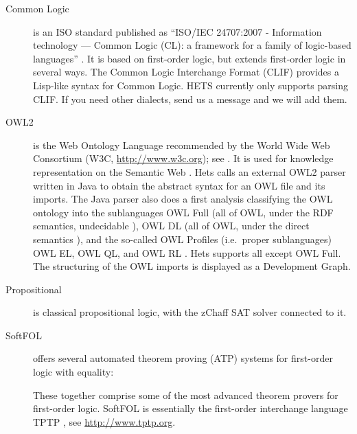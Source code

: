 \documentclass{article}
\newcommand{\normalTEXTSC}[2]{{#1\scriptsize#2}}
\newcommand     {\Hets}{\normalTEXTSC{H}{ETS}\xspace}
\newcommand     {\SPASS}{\normalTEXTSC{S}{PASS}\xspace}
\begin{document}
\begin{description}


\item[Common Logic] is an ISO standard published as ``ISO/IEC 24707:2007 - Information technology — Common Logic (CL): a framework for a family of logic-based languages'' \cite{CommonLogic:oldfashioned}. It is based on first-order logic, but extends first-order
logic in several ways.   The Common Logic
  Interchange Format (CLIF) provides a Lisp-like syntax for Common
  Logic.  \Hets currently only supports parsing CLIF. If you need
  other dialects, send us a message and we will add them.

\item[OWL2] is the Web Ontology Language recommended by the
  World Wide Web Consortium (W3C, \url{http://www.w3c.org}); see \cite{w3c:owl2-overview}. It is
  used for knowledge representation on the Semantic Web
  \cite{berners:2001:SWeb}.
Hets calls an external OWL2 parser
  written in Java to obtain the abstract syntax for an OWL file and its
  imports. The Java parser also does a first analysis classifying
  the OWL ontology into the sublanguages OWL Full (all of OWL, under the RDF semantics, undecidable \cite{w3c:owl2-rdf-based-semantics}), OWL DL (all of OWL, under the direct semantics \cite{w3c:owl2-direct-semantics}), and the so-called OWL Profiles (i.e.\ proper sublanguages) OWL EL, OWL QL, and OWL RL \cite{w3c:owl2-profiles}.
 Hets supports all except OWL Full.
The
  structuring of the OWL imports is displayed as a Development Graph.

\item[Propositional] is classical propositional logic, with
the zChaff SAT solver \cite{Herbstritt03} connected to it.

\item[SoftFOL] \cite{LuettichEA06a} offers several automated theorem
  proving (ATP) systems for first-order logic with equality: 
  These together comprise some of the most advanced theorem provers
  for first-order logic. SoftFOL is essentially the first-order
  interchange language TPTP \cite{DBLP:conf/lpar/Sutcliffe10},
see \url{http://www.tptp.org}.


\end{description}
\end{document}
